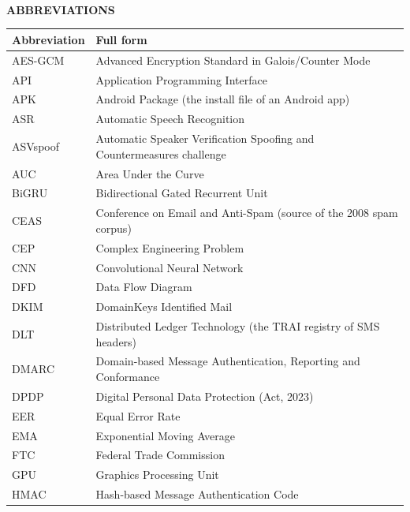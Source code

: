 \chapter*{}                  %
\\[0.3cm]
{\Large\bfseries ABBREVIATIONS}\\[0.3cm]

{\small{}
\begin{longtable}{|p{2.7cm}|p{11.5cm}|}
\hline \textbf{Abbreviation} & \textbf{Full form} \\ \hline
\endhead
AES-GCM & Advanced Encryption Standard in Galois/Counter Mode \\ \hline
API & Application Programming Interface \\ \hline
APK & Android Package (the install file of an Android app) \\ \hline
ASR & Automatic Speech Recognition \\ \hline
ASVspoof & Automatic Speaker Verification Spoofing and Countermeasures challenge \\ \hline
AUC & Area Under the Curve \\ \hline
BiGRU & Bidirectional Gated Recurrent Unit \\ \hline
CEAS & Conference on Email and Anti-Spam (source of the 2008 spam corpus) \\ \hline
CEP & Complex Engineering Problem \\ \hline
CNN & Convolutional Neural Network \\ \hline
DFD & Data Flow Diagram \\ \hline
DKIM & DomainKeys Identified Mail \\ \hline
DLT & Distributed Ledger Technology (the TRAI registry of SMS headers) \\ \hline
DMARC & Domain-based Message Authentication, Reporting and Conformance \\ \hline
DPDP & Digital Personal Data Protection (Act, 2023) \\ \hline
EER & Equal Error Rate \\ \hline
EMA & Exponential Moving Average \\ \hline
FTC & Federal Trade Commission \\ \hline
GPU & Graphics Processing Unit \\ \hline
HMAC & Hash-based Message Authentication Code \\ \hline

\end{longtable}}
